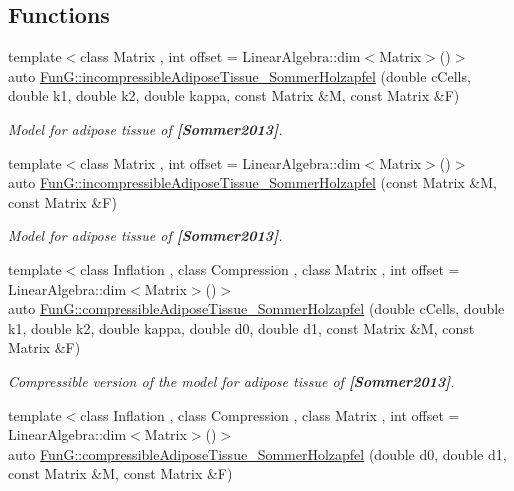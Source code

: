 \subsection*{Functions}
\begin{DoxyCompactItemize}
\item 
{\footnotesize template$<$class Matrix , int offset = Linear\+Algebra\+::dim$<$\+Matrix$>$()$>$ }\\auto \hyperlink{group__Biomechanics_gac269eefc1abb994044e1634c20a98061}{Fun\+G\+::incompressible\+Adipose\+Tissue\+\_\+\+Sommer\+Holzapfel} (double c\+Cells, double k1, double k2, double kappa, const Matrix \&M, const Matrix \&F)
\begin{DoxyCompactList}\small\item\em Model for adipose tissue of {\bfseries [Sommer2013]}. \end{DoxyCompactList}\item 
{\footnotesize template$<$class Matrix , int offset = Linear\+Algebra\+::dim$<$\+Matrix$>$()$>$ }\\auto \hyperlink{group__Biomechanics_ga01ab128bcf179f4431b0270179af9e20}{Fun\+G\+::incompressible\+Adipose\+Tissue\+\_\+\+Sommer\+Holzapfel} (const Matrix \&M, const Matrix \&F)
\begin{DoxyCompactList}\small\item\em Model for adipose tissue of {\bfseries [Sommer2013]}. \end{DoxyCompactList}\item 
{\footnotesize template$<$class Inflation , class Compression , class Matrix , int offset = Linear\+Algebra\+::dim$<$\+Matrix$>$()$>$ }\\auto \hyperlink{group__Biomechanics_ga5c3388564c0420b62e58f48c739d27f1}{Fun\+G\+::compressible\+Adipose\+Tissue\+\_\+\+Sommer\+Holzapfel} (double c\+Cells, double k1, double k2, double kappa, double d0, double d1, const Matrix \&M, const Matrix \&F)
\begin{DoxyCompactList}\small\item\em Compressible version of the model for adipose tissue of {\bfseries [Sommer2013]}. \end{DoxyCompactList}\item 
{\footnotesize template$<$class Inflation , class Compression , class Matrix , int offset = Linear\+Algebra\+::dim$<$\+Matrix$>$()$>$ }\\auto \hyperlink{group__Biomechanics_ga27bb3f7c579ce8c21a69ea4d4d0169d7}{Fun\+G\+::compressible\+Adipose\+Tissue\+\_\+\+Sommer\+Holzapfel} (double d0, double d1, const Matrix \&M, const Matrix \&F)

\end{DoxyCompactItemize}
